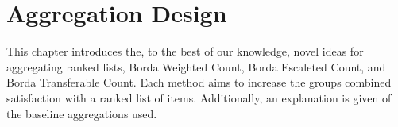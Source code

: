 \chapter{Aggregation Design}

This chapter introduces the, to the best of our knowledge, novel ideas for aggregating ranked lists, Borda Weighted Count, Borda Escaleted Count, and Borda Transferable Count. Each method aims to increase the groups combined satisfaction with a ranked list of items. Additionally, an explanation is given of the baseline aggregations used.


